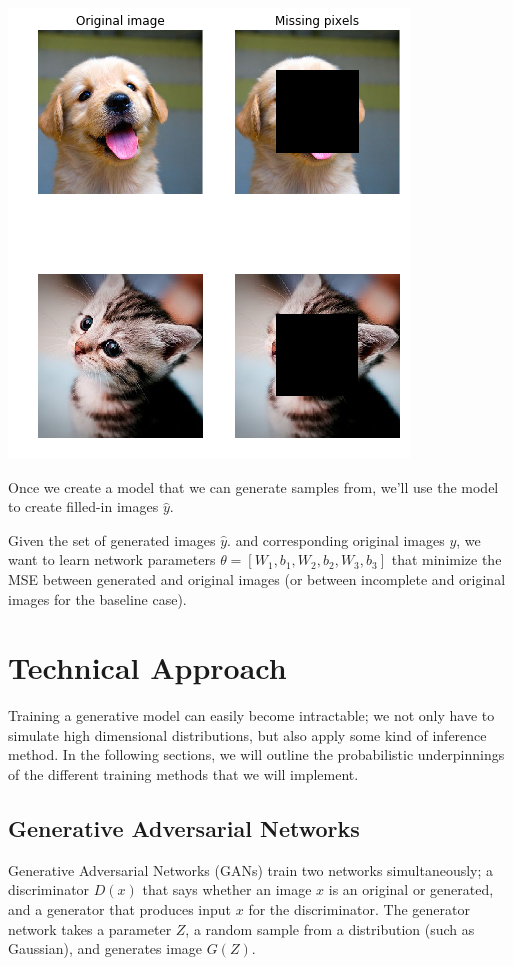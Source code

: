 \documentclass[10pt,twocolumn,letterpaper]{article}
\begin{document}
\includegraphics[width=1.0\linewidth]{img_sample.png}

Once we create a model that we can generate samples from, we'll use the model to create filled-in images $\hat{y}$.

Given the set of generated images $\hat{y}$. and corresponding original images $y$, we want to learn network parameters  $ \theta = [W_1, b_1, W_2, b_2, W_3, b_3]$ that minimize the MSE between generated and original images (or between incomplete and original images for the baseline case). 

\section{Technical Approach}

Training a generative model can easily become intractable; we not only have to simulate high dimensional distributions, but also apply some kind of inference method. In the following sections, we will outline the probabilistic underpinnings of the different training methods that we will implement. 

\subsection{Generative Adversarial Networks}
Generative Adversarial Networks (GANs) train two networks simultaneously; a discriminator $D(x)$ that says whether an image $x$ is an original or generated, and a generator that produces input $x$ for the discriminator. The generator network takes a parameter $Z$, a random sample from a distribution (such as Gaussian), and generates image $G(Z)$.
\end{document}
